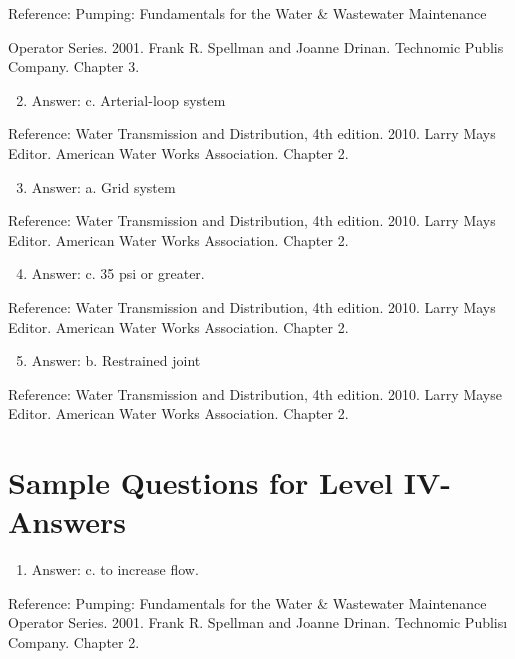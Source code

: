 \documentclass[10pt]{article}
\begin{document}
Reference: Pumping: Fundamentals for the Water \& Wastewater Maintenance

Operator Series. 2001. Frank R. Spellman and Joanne Drinan. Technomic Publis Company. Chapter 3.

\begin{enumerate}
  \setcounter{enumi}{1}
  \item Answer: c. Arterial-loop system
\end{enumerate}

Reference: Water Transmission and Distribution, 4th edition. 2010. Larry Mays Editor. American Water Works Association. Chapter 2.

\begin{enumerate}
  \setcounter{enumi}{2}
  \item Answer: a. Grid system
\end{enumerate}

Reference: Water Transmission and Distribution, 4th edition. 2010. Larry Mays Editor. American Water Works Association. Chapter 2.

\begin{enumerate}
  \setcounter{enumi}{3}
  \item Answer: c. 35 psi or greater.
\end{enumerate}

Reference: Water Transmission and Distribution, 4th edition. 2010. Larry Mays Editor. American Water Works Association. Chapter 2.

\begin{enumerate}
  \setcounter{enumi}{4}
  \item Answer: b. Restrained joint
\end{enumerate}

Reference: Water Transmission and Distribution, 4th edition. 2010. Larry Mayse Editor. American Water Works Association. Chapter 2.

\section{Sample Questions for Level IV-Answers}
\begin{enumerate}
  \item Answer: c. to increase flow.
\end{enumerate}

Reference: Pumping: Fundamentals for the Water \& Wastewater Maintenance Operator Series. 2001. Frank R. Spellman and Joanne Drinan. Technomic Publisı Company. Chapter 2.
\end{document}
